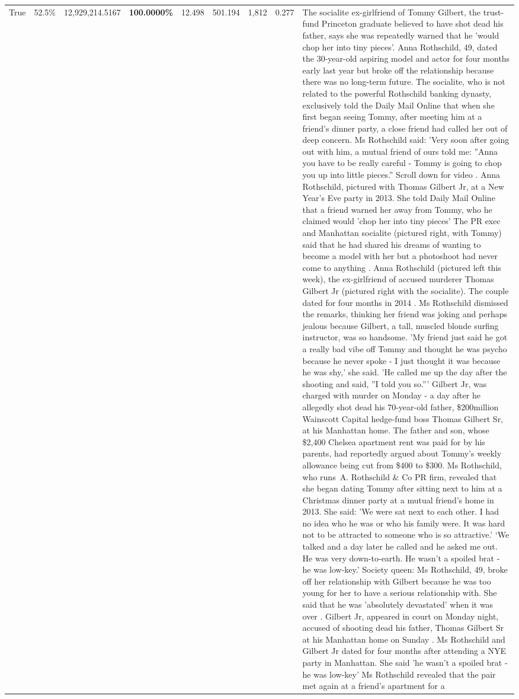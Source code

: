 \begin{table}[H]
\begin{tabular}{lllrlllll}
True & 52.5\% & 12,929,214.5167 & \bfseries \color{red} 100.0000\% & 12.498 & 501.194 & 1,812 & 0.277 & The socialite ex-girlfriend of Tommy Gilbert, the trust-fund Princeton graduate believed to have shot dead his father, says she was repeatedly warned that he 'would chop her into tiny pieces'. Anna Rothschild, 49, dated the 30-year-old aspiring model and actor for four months early last year but broke off the relationship because there was no long-term future. The socialite, who is not related to the powerful Rothschild banking dynasty, exclusively told the Daily Mail Online that when she first began seeing Tommy, after meeting him at a friend's dinner party, a close friend had called her out of deep concern. Ms Rothschild said: 'Very soon after going out with him, a mutual friend of ours told me: ''Anna you have to be really careful - Tommy is going to chop you up into little pieces.'' Scroll down for video . Anna Rothschild, pictured with Thomas Gilbert Jr, at a New Year's Eve party in 2013. She told Daily Mail Online that a friend warned her away from Tommy, who he claimed would 'chop her into tiny pieces' The PR exec and Manhattan socialite (pictured right, with Tommy) said that he had shared his dreams of wanting to become a model with her but a photoshoot had never come to anything . Anna Rothschild (pictured left this week), the ex-girlfriend of accused murderer Thomas Gilbert Jr (pictured right with the socialite). The couple dated for four months in 2014 . Ms Rothschild dismissed the remarks, thinking her friend was joking and perhaps jealous because Gilbert, a tall, muscled blonde surfing instructor, was so handsome. 'My friend just said he got a really bad vibe off Tommy and thought he was psycho because he never spoke - I just thought it was because he was shy,' she said. 'He called me up the day after the shooting and said, ''I told you so.''' Gilbert Jr, was charged with murder on Monday - a day after he allegedly shot dead his 70-year-old father, \$200million Wainscott Capital hedge-fund boss Thomas Gilbert Sr, at his Manhattan home. The father and son, whose \$2,400 Chelsea apartment rent was paid for by his parents, had reportedly argued about Tommy's weekly allowance being cut from \$400 to \$300. Ms Rothschild, who runs A. Rothschild \& Co PR firm, revealed that she began dating Tommy after sitting next to him at a Christmas dinner party at a mutual friend's home in 2013. She said: 'We were sat next to each other. I had no idea who he was or who his family were. It was hard not to be attracted to someone who is so attractive.' ‘We talked and a day later he called and he asked me out. He was very down-to-earth. He wasn’t a spoiled brat - he was low-key.’ Society queen: Ms Rothschild, 49, broke off her relationship with Gilbert because he was too young for her to have a serious relationship with. She said that he was 'absolutely devastated' when it was over . Gilbert Jr, appeared in court on Monday night, accused of shooting dead his father, Thomas Gilbert Sr at his Manhattan home on Sunday . Ms Rothschild and Gilbert Jr dated for four months after attending a NYE party in Manhattan. She said 'he wasn't a spoiled brat - he was low-key' Ms Rothschild revealed that the pair met again at a friend’s apartment for a 
\end{tabular}
\end{table}

